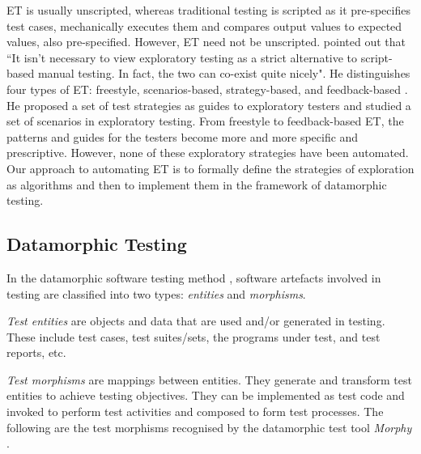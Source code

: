 \documentclass[preprint,1p,authoryear,times]{elsarticle}
\begin{document}
ET is usually unscripted, whereas traditional testing is scripted as it pre-specifies test cases, mechanically executes them and compares output values to expected values, also pre-specified. However, ET need not be unscripted. \citet{whittaker2009exploratory} pointed out that ``It isn't necessary to view exploratory testing as a strict alternative to script-based manual testing. In fact, the two can co-exist quite nicely". He distinguishes four types of ET: freestyle, scenarios-based, strategy-based, and feedback-based \cite[Page 184]{whittaker2009exploratory}. He proposed a set of test strategies as guides to exploratory testers and studied a set of scenarios in exploratory testing. From freestyle to feedback-based ET, the patterns and guides for the testers become more and more specific and prescriptive. However, none of these exploratory strategies have been automated. Our approach to automating ET is to formally define the strategies of exploration as algorithms and then to implement them in the framework of datamorphic testing. 


\subsection{Datamorphic Testing}\label{sect:OverviewDatamorphicTest}

In the datamorphic software testing method \citep{AITest2020TR}, software artefacts involved in testing are classified into two types: \emph{entities} and \emph{morphisms}. 

\emph{Test entities} are objects and data that are used and/or generated in testing. These include test cases, test suites/sets, the programs under test, and test reports, etc. 

\emph{Test morphisms} are mappings between entities. They generate and transform test entities to achieve testing objectives. They can be implemented as test code and invoked to perform test activities and composed to form test processes. The following are the test morphisms recognised by the datamorphic test tool \emph{Morphy} \citep{AITest2020}. 
\end{document}
